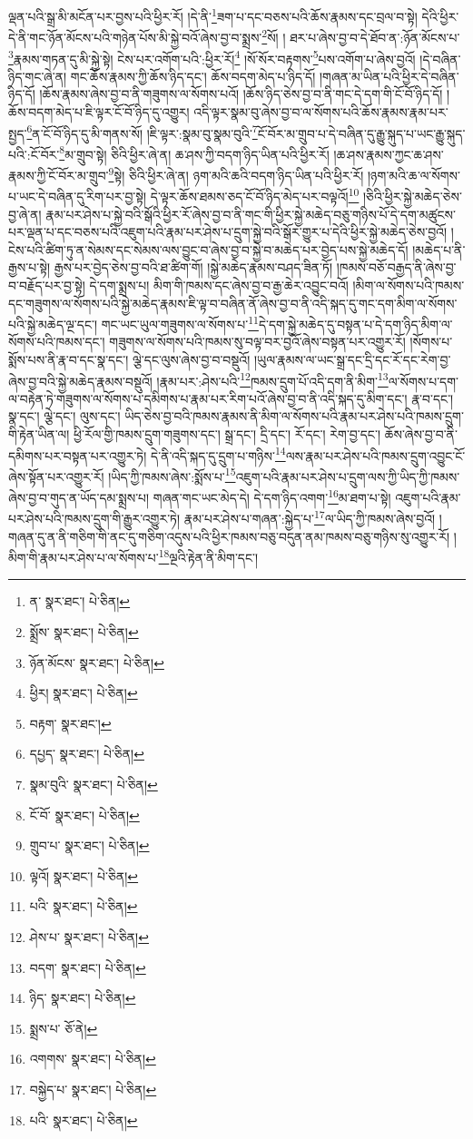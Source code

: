ལྡན་པའི་སྒྲ་མི་མངོན་པར་བྱས་པའི་ཕྱིར་རོ། །དེ་ནི་\footnote{ན་  སྣར་ཐང་།  པེ་ཅིན། }ཟག་པ་དང་བཅས་པའི་ཆོས་རྣམས་དང་བྲལ་བ་སྟེ། དེའི་ཕྱིར་དེ་ནི་གང་ཉོན་མོངས་པའི་གཉེན་པོས་མི་སྐྱེ་བའོ་ཞེས་བྱ་བ་སྨྲས་\footnote{སྨྲོས་  སྣར་ཐང་།  པེ་ཅིན། }སོ། །
ཐར་པ་ཞེས་བྱ་བ་དེ་ཐོབ་ན་:ཉོན་མོངས་པ་\footnote{ཉོན་མོངས་  སྣར་ཐང་།  པེ་ཅིན། }རྣམས་གཏན་དུ་མི་སྐྱེ་སྟེ། ངེས་པར་འགོག་པའི་:ཕྱིར་རོ།\footnote{ཕྱིར།  སྣར་ཐང་།  པེ་ཅིན། } །སོ་སོར་བརྟགས་\footnote{བརྟག་  སྣར་ཐང་། }པས་འགོག་པ་ཞེས་བྱའོ། །དེ་བཞིན་ཉིད་གང་ཞེ་ན། གང་ཆོས་རྣམས་ཀྱི་ཆོས་ཉིད་དང་། ཆོས་བདག་མེད་པ་ཉིད་དོ། །གཞན་མ་ཡིན་པའི་ཕྱིར་དེ་བཞིན་ཉིད་དོ། །ཆོས་རྣམས་ཞེས་བྱ་བ་ནི་གཟུགས་ལ་སོགས་པའོ། །ཆོས་ཉིད་ཅེས་བྱ་བ་ནི་གང་དེ་དག་གི་ངོ་བོ་ཉིད་དོ། །ཆོས་བདག་མེད་པ་ཇི་ལྟར་ངོ་བོ་ཉིད་དུ་འགྱུར། འདི་ལྟར་སྣམ་བུ་ཞེས་བྱ་བ་ལ་སོགས་པའི་ཆོས་རྣམས་རྣམ་པར་སྤྱད་\footnote{དཔྱད་  སྣར་ཐང་།  པེ་ཅིན། }ན་ངོ་བོ་ཉིད་དུ་མི་གནས་སོ། །ཇི་ལྟར་:སྣམ་བུ་སྣམ་བུའི་\footnote{སྣམ་བུའི་  སྣར་ཐང་།  པེ་ཅིན། }ངོ་བོར་མ་གྲུབ་པ་དེ་བཞིན་དུ་རྒྱུ་སྐུད་པ་ཡང་རྒྱུ་སྐུད་པའི་:ངོ་བོར་\footnote{ངོ་བོ་  སྣར་ཐང་།  པེ་ཅིན། }མ་གྲུབ་སྟེ། ཅིའི་ཕྱིར་ཞེ་ན། ཆ་ཤས་ཀྱི་བདག་ཉིད་ཡིན་པའི་ཕྱིར་རོ། །ཆ་ཤས་རྣམས་ཀྱང་ཆ་ཤས་རྣམས་ཀྱི་ངོ་བོར་མ་གྲུབ་\footnote{གྲུབ་པ་  སྣར་ཐང་།  པེ་ཅིན། }སྟེ། ཅིའི་ཕྱིར་ཞེ་ན། ཉག་མའི་ཆའི་བདག་ཉིད་ཡིན་པའི་ཕྱིར་རོ། །ཉག་མའི་ཆ་ལ་སོགས་པ་ཡང་དེ་བཞིན་དུ་རིག་པར་བྱ་སྟེ། དེ་ལྟར་ཆོས་ཐམས་ཅད་ངོ་བོ་ཉིད་མེད་པར་བལྟའོ།\footnote{ལྟའོ།  སྣར་ཐང་།  པེ་ཅིན། } །ཅིའི་ཕྱིར་སྐྱེ་མཆེད་ཅེས་བྱ་ཞེ་ན། རྣམ་པར་ཤེས་པ་སྐྱེ་བའི་སྒོའི་ཕྱིར་རོ་ཞེས་བྱ་བ་ནི་གང་གི་ཕྱིར་སྐྱེ་མཆེད་བཅུ་གཉིས་པོ་དེ་དག་མཚུངས་པར་ལྡན་པ་དང་བཅས་པའི་འཇུག་པའི་རྣམ་པར་ཤེས་པ་དྲུག་སྐྱེ་བའི་སྒོར་གྱུར་པ་དེའི་ཕྱིར་སྐྱེ་མཆེད་ཅེས་བྱའོ། །ངེས་པའི་ཚིག་ཏུ་ན་སེམས་དང་སེམས་ལས་བྱུང་བ་ཞེས་བྱ་བ་སྐྱེ་བ་མཆེད་པར་བྱེད་པས་སྐྱེ་མཆེད་དོ། །མཆེད་པ་ནི་རྒྱས་པ་སྟེ། རྒྱས་པར་བྱེད་ཅེས་བྱ་བའི་ཐ་ཚིག་གོ། །སྐྱེ་མཆེད་རྣམས་བཤད་ཟིན་ཏོ། །ཁམས་བཅོ་བརྒྱད་ནི་ཞེས་བྱ་བ་བརྗོད་པར་བྱ་སྟེ། དེ་དག་སྨྲས་པ། མིག་གི་ཁམས་དང་ཞེས་བྱ་བ་རྒྱ་ཆེར་འབྱུང་བའོ། །མིག་ལ་སོགས་པའི་ཁམས་དང་གཟུགས་ལ་སོགས་པའི་སྐྱེ་མཆེད་རྣམས་ཇི་ལྟ་བ་བཞིན་ནོ་ཞེས་བྱ་བ་ནི་འདི་སྐད་དུ་གང་དག་མིག་ལ་སོགས་པའི་སྐྱེ་མཆེད་ལྔ་དང་། གང་ཡང་ཡུལ་གཟུགས་ལ་སོགས་པ་\footnote{པའི་  སྣར་ཐང་།  པེ་ཅིན། }དེ་དག་སྐྱེ་མཆེད་དུ་བསྟན་པ་དེ་དག་ཉིད་མིག་ལ་སོགས་པའི་ཁམས་དང་། གཟུགས་ལ་སོགས་པའི་ཁམས་སུ་བལྟ་བར་བྱའོ་ཞེས་བསྟན་པར་འགྱུར་རོ། །སོགས་པ་སྨོས་པས་ནི་རྣ་བ་དང་སྣ་དང་། ལྕེ་དང་ལུས་ཞེས་བྱ་བ་བསྡུའོ། །ཡུལ་རྣམས་ལ་ཡང་སྒྲ་དང་དྲི་དང་རོ་དང་རེག་བྱ་ཞེས་བྱ་བའི་སྐྱེ་མཆེད་རྣམས་བསྡུའོ། །རྣམ་པར་:ཤེས་པའི་\footnote{ཤེས་པ་  སྣར་ཐང་།  པེ་ཅིན། }ཁམས་དྲུག་པོ་འདི་དག་ནི་མིག་\footnote{བདག་  སྣར་ཐང་།  པེ་ཅིན། }ལ་སོགས་པ་དག་ལ་བརྟེན་ཏེ་གཟུགས་ལ་སོགས་པ་དམིགས་པ་རྣམ་པར་རིག་པའོ་ཞེས་བྱ་བ་ནི་འདི་སྐད་དུ་མིག་དང་། རྣ་བ་དང་། སྣ་དང་། ལྕེ་དང་། ལུས་དང་། ཡིད་ཅེས་བྱ་བའི་ཁམས་རྣམས་ནི་མིག་ལ་སོགས་པའི་རྣམ་པར་ཤེས་པའི་ཁམས་དྲུག་གི་རྟེན་ཡིན་ལ། ཕྱི་རོལ་གྱི་ཁམས་དྲུག་གཟུགས་དང་། སྒྲ་དང་། དྲི་དང་། རོ་དང་། རེག་བྱ་དང་། ཆོས་ཞེས་བྱ་བ་ནི་དམིགས་པར་བསྟན་པར་འགྱུར་ཏེ། དེ་ནི་འདི་སྐད་དུ་དྲུག་པ་གཉིས་\footnote{ཉིད་  སྣར་ཐང་།  པེ་ཅིན། }ལས་རྣམ་པར་ཤེས་པའི་ཁམས་དྲུག་འབྱུང་ངོ་ཞེས་སྟོན་པར་འགྱུར་རོ། །ཡིད་ཀྱི་ཁམས་ཞེས་:སྨོས་པ་\footnote{སྨྲས་པ་  ཅོ་ནེ། }འཇུག་པའི་རྣམ་པར་ཤེས་པ་དྲུག་ལས་ཀྱི་ཡིད་ཀྱི་ཁམས་ཞེས་བྱ་བ་གུད་ན་ཡོད་དམ་སྨྲས་པ། གཞན་གང་ཡང་མེད་དེ། དེ་དག་ཉིད་འགག་\footnote{འགགས་  སྣར་ཐང་།  པེ་ཅིན། }མ་ཐག་པ་སྟེ། འཇུག་པའི་རྣམ་པར་ཤེས་པའི་ཁམས་དྲུག་གི་རྒྱུར་འགྱུར་ཏེ། རྣམ་པར་ཤེས་པ་གཞན་:སྐྱེད་པ་\footnote{བསྐྱེད་པ་  སྣར་ཐང་།  པེ་ཅིན། }ལ་ཡིད་ཀྱི་ཁམས་ཞེས་བྱའོ། །གཞན་དུ་ན་ནི་གཅིག་གི་ནང་དུ་གཅིག་འདུས་པའི་ཕྱིར་ཁམས་བཅུ་བདུན་ནམ་ཁམས་བཅུ་གཉིས་སུ་འགྱུར་རོ། །མིག་གི་རྣམ་པར་ཤེས་པ་ལ་སོགས་པ་\footnote{པའི་  སྣར་ཐང་།  པེ་ཅིན། }ལྔའི་རྟེན་ནི་མིག་དང་། 